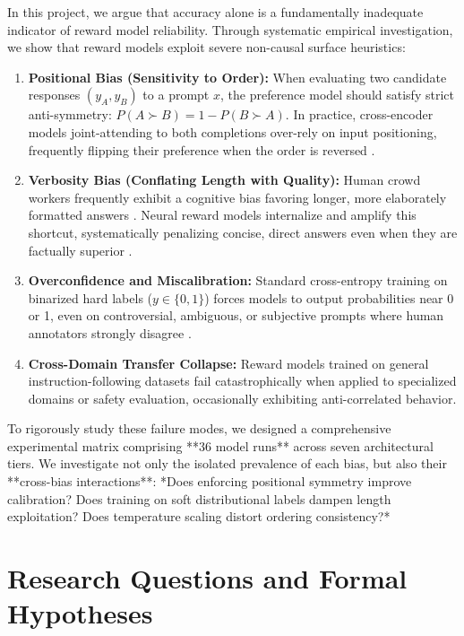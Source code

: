 \documentclass[12pt,a4paper]{article}
\begin{document}
In this project, we argue that accuracy alone is a fundamentally inadequate indicator of reward model reliability. Through systematic empirical investigation, we show that reward models exploit severe non-causal surface heuristics:
\begin{enumerate}
    \item \textbf{Positional Bias (Sensitivity to Order):} When evaluating two candidate responses $(y_A, y_B)$ to a prompt $x$, the preference model should satisfy strict anti-symmetry: $P(A \succ B) = 1 - P(B \succ A)$. In practice, cross-encoder models joint-attending to both completions over-rely on input positioning, frequently flipping their preference when the order is reversed \citep{wang2023large,pezeshkpour2023large}.
    \item \textbf{Verbosity Bias (Conflating Length with Quality):} Human crowd workers frequently exhibit a cognitive bias favoring longer, more elaborately formatted answers \citep{singhal2023long}. Neural reward models internalize and amplify this shortcut, systematically penalizing concise, direct answers even when they are factually superior \citep{dubois2024length}.
    \item \textbf{Overconfidence and Miscalibration:} Standard cross-entropy training on binarized hard labels ($y \in \{0, 1\}$) forces models to output probabilities near 0 or 1, even on controversial, ambiguous, or subjective prompts where human annotators strongly disagree \citep{guo2017calibration}.
    \item \textbf{Cross-Domain Transfer Collapse:} Reward models trained on general instruction-following datasets fail catastrophically when applied to specialized domains or safety evaluation, occasionally exhibiting anti-correlated behavior.
\end{enumerate}

To rigorously study these failure modes, we designed a comprehensive experimental matrix comprising **36 model runs** across seven architectural tiers. We investigate not only the isolated prevalence of each bias, but also their **cross-bias interactions**: *Does enforcing positional symmetry improve calibration? Does training on soft distributional labels dampen length exploitation? Does temperature scaling distort ordering consistency?*

\section{Research Questions and Formal Hypotheses}
\end{document}
